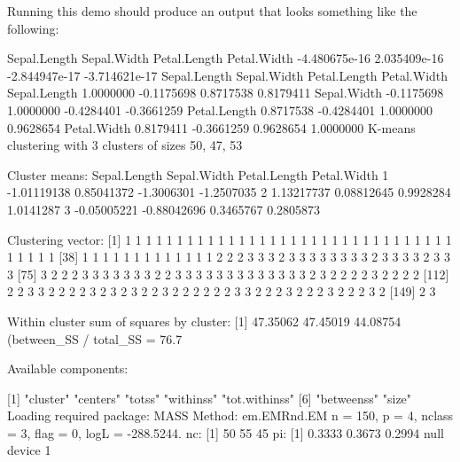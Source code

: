 Running this demo should produce an output that looks something like the following:
\begin{Output}
 Sepal.Length   Sepal.Width  Petal.Length   Petal.Width 
-4.480675e-16  2.035409e-16 -2.844947e-17 -3.714621e-17 
             Sepal.Length Sepal.Width Petal.Length Petal.Width
Sepal.Length    1.0000000  -0.1175698    0.8717538   0.8179411
Sepal.Width    -0.1175698   1.0000000   -0.4284401  -0.3661259
Petal.Length    0.8717538  -0.4284401    1.0000000   0.9628654
Petal.Width     0.8179411  -0.3661259    0.9628654   1.0000000
K-means clustering with 3 clusters of sizes 50, 47, 53

Cluster means:
  Sepal.Length Sepal.Width Petal.Length Petal.Width
1  -1.01119138  0.85041372   -1.3006301  -1.2507035
2   1.13217737  0.08812645    0.9928284   1.0141287
3  -0.05005221 -0.88042696    0.3465767   0.2805873

Clustering vector:
  [1] 1 1 1 1 1 1 1 1 1 1 1 1 1 1 1 1 1 1 1 1 1 1 1 1 1 1 1 1 1 1 1 1 1 1 1 1 1
 [38] 1 1 1 1 1 1 1 1 1 1 1 1 1 2 2 2 3 3 3 2 3 3 3 3 3 3 3 3 2 3 3 3 3 2 3 3 3
 [75] 3 2 2 2 3 3 3 3 3 3 3 2 2 3 3 3 3 3 3 3 3 3 3 3 3 3 2 3 2 2 2 2 3 2 2 2 2
[112] 2 2 3 3 2 2 2 2 3 2 3 2 3 2 2 3 2 2 2 2 2 2 3 3 2 2 2 3 2 2 2 3 2 2 2 3 2
[149] 2 3

Within cluster sum of squares by cluster:
[1] 47.35062 47.45019 44.08754
 (between_SS / total_SS =  76.7 %

Available components:

[1] "cluster"      "centers"      "totss"        "withinss"     "tot.withinss"
[6] "betweenss"    "size"        
Loading required package: MASS
Method: em.EMRnd.EM
 n = 150, p = 4, nclass = 3, flag = 0, logL = -288.5244.
nc: 
[1] 50 55 45
pi: 
[1] 0.3333 0.3673 0.2994
null device 
          1 
\end{Output}

